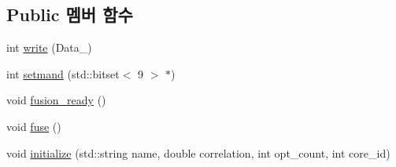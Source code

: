 \subsection*{Public 멤버 함수}
\begin{DoxyCompactItemize}
\item 
int \hyperlink{classFusion__operator_a9336f2c0bf50620148cdd404cc139843}{write} (Data\+\_)
\item 
int \hyperlink{classFusion__operator_a132cd952907c90ae57ede626900d42c1}{setmand} (std\+::bitset$<$ 9 $>$ $\ast$)
\item 
void \hyperlink{classFusion__operator_adc41869c62a2702bcdf55c124cbf279c}{fusion\+\_\+ready} ()
\item 
void \hyperlink{classFusion__operator_a3f543c87eea905946c33e1a00bcc4e0b}{fuse} ()
\item 
void \hyperlink{classFusion__operator_a6e5a527e137d815675137e195a81bc8c}{initialize} (std\+::string name, double correlation, int opt\+\_\+count, int core\+\_\+id)
\end{DoxyCompactItemize}
